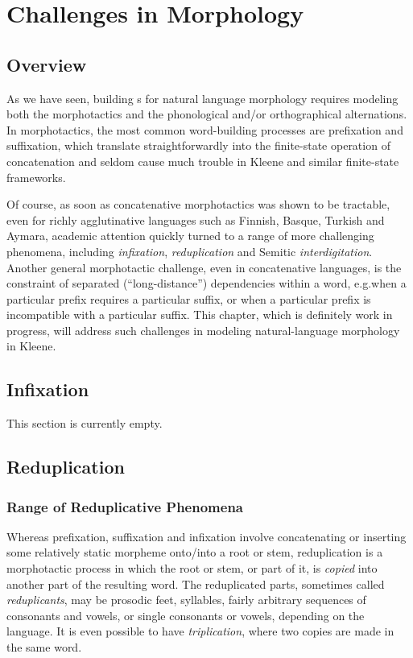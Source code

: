 \chapter{Challenges in Morphology}

\section{Overview}

As we have seen, building \fsm{}s for
natural language morphology requires modeling both
the morphotactics and the phonological and/or orthographical alternations.
In morphotactics, the most common word-building processes are prefixation and suffixation,
which translate straightforwardly into the finite-state operation of concatenation and seldom
cause much trouble in Kleene and similar finite-state frameworks.  

Of course, as soon as concatenative morphotactics was shown to be tractable, even for
richly agglutinative languages such as Finnish, Basque, Turkish and Aymara, academic attention
quickly turned to a range of more challenging phenomena, including \emph{infixation}, \emph{reduplication} and Semitic
\emph{interdigitation}.  Another general morphotactic challenge, even in concatenative languages, is the 
constraint of separated (``long-distance'') dependencies within a word, e.g.\@ when a particular prefix
requires a particular suffix, or when a particular prefix is incompatible with a particular suffix.  This
chapter, which is definitely work in progress, will address such challenges in modeling
natural-language morphology in Kleene.

\section{Infixation}

This section is currently empty.

\section{Reduplication}

\subsection{Range of Reduplicative Phenomena}

Whereas prefixation, suffixation and infixation involve concatenating or inserting 
some relatively static morpheme onto/into
a root or stem, reduplication is a morphotactic process in which the root or stem, or part of it,
is \emph{copied} into another part of the resulting word.  The reduplicated parts, sometimes called
\emph{reduplicants}, may be prosodic feet, syllables,
fairly arbitrary sequences of consonants and vowels, or single consonants or vowels, depending on
the language.
It is even possible to have \emph{triplication}, where two copies are made in the same word.


